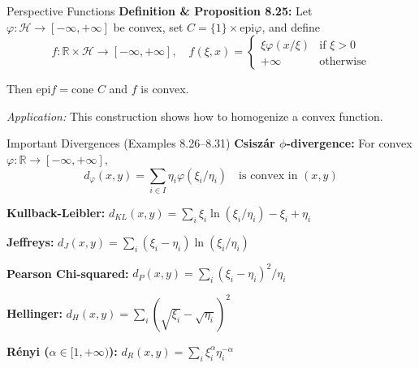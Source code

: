 \documentclass[aspectratio=169,10pt]{beamer}
\begin{document}
\begin{frame}[fragile]{Perspective Functions}
    \textbf{Definition \& Proposition 8.25:} Let $\varphi : \mathcal{H} \to [-\infty, +\infty]$ be convex, 
    set $C = \{1\} \times \text{epi} \varphi$, and define
    \[
    f : \mathbb{R} \times \mathcal{H} \to [-\infty, +\infty], \quad f(\xi, x) = \begin{cases}
        \xi \varphi(x/\xi) & \text{if } \xi > 0 \\
        +\infty & \text{otherwise}
    \end{cases}
    \]
    
    Then $\text{epi} f = \text{cone } C$ and $f$ is convex.

    \vspace{0.3cm}

    \textit{Application:} This construction shows how to homogenize a convex function.
\end{frame}

\begin{frame}[fragile]{Important Divergences (Examples 8.26--8.31)}
    \textbf{Csiszár $\phi$-divergence:} For convex $\varphi : \mathbb{R} \to [-\infty, +\infty]$,
    \[
    d_\varphi(x,y) = \sum_{i \in I} \eta_i \varphi(\xi_i/\eta_i) \quad \text{is convex in }(x,y)
    \]

    \vspace{0.2cm}

    \textbf{Kullback-Leibler:} $d_{KL}(x,y) = \sum_i \xi_i \ln(\xi_i/\eta_i) - \xi_i + \eta_i$

    \vspace{0.2cm}

    \textbf{Jeffreys:} $d_J(x,y) = \sum_i (\xi_i - \eta_i) \ln(\xi_i/\eta_i)$ 

    \vspace{0.2cm}

    \textbf{Pearson Chi-squared:} $d_P(x,y) = \sum_i (\xi_i - \eta_i)^2 / \eta_i$

    \vspace{0.2cm}

    \textbf{Hellinger:} $d_H(x,y) = \sum_i (\sqrt{\xi_i} - \sqrt{\eta_i})^2$

    \vspace{0.2cm}

    \textbf{Rényi ($\alpha \in [1,+\infty)$):} $d_R(x,y) = \sum_i \xi_i^\alpha \eta_i^{-\alpha}$
\end{frame}
\end{document}
